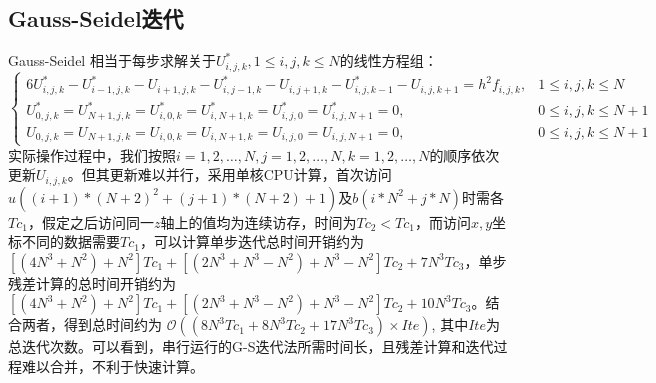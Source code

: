\documentclass{article}
\newcommand{\mO}{\mathcal O}
\begin{document}
\subsection{Gauss-Seidel迭代}
Gauss-Seidel \cite{seidel1873ueber} 相当于每步求解关于$U_{i,j,k}^*,1\le i,j,k\le N$的线性方程组：
\begin{equation}
	\left\{\begin{aligned}
		6 U_{i, j, k}^{*}-U_{i-1, j, k}^{*}-U_{i+1, j, k}-U_{i, j-1, k}^{*}-U_{i, j+1, k}-U_{i, j, k-1}^{*}-U_{i, j, k+1}=h^{2} f_{i, j, k}, & 1 \leq i, j, k \leq N \\
		U_{0, j, k}^{*}=U_{N+1, j, k}^{*}=U_{i, 0, k}^{*}=U_{i, N+1, k}^{*}=U_{i, j, 0}^{*}=U_{i, j, N+1}^{*}=0, & 0 \leq i, j, k \leq N+1 \\
		U_{0, j, k}=U_{N+1, j, k}=U_{i, 0, k}=U_{i, N+1, k}=U_{i, j, 0}=U_{i, j, N+1}=0, & 0 \leq i, j, k \leq N+1
	\end{aligned}\right.
\end{equation}
实际操作过程中，我们按照$i=1,2,\dots,N,j=1,2,\dots,N,k=1,2,\dots,N$的顺序依次更新$U_{i,j,k}$。但其更新难以并行，采用单核CPU计算，首次访问$u((i+1)*(N+2)^2+(j+1)*(N+2)+1)$及$b(i*N^2+j*N)$时需各$Tc_1$，假定之后访问同一$z$轴上的值均为连续访存，时间为$Tc_2<Tc_1$，而访问$x,y$坐标不同的数据需要$Tc_1$，可以计算单步迭代总时间开销约为$[(4N^3 + N^2) + N^2]Tc_1 + [(2N^3+N^3-N^2)+ N^3-N^2]Tc_2 + 7N^3Tc_3 $，单步残差计算的总时间开销约为$[(4N^3 + N^2) + N^2]Tc_1 + [(2N^3+N^3-N^2)+ N^3-N^2]Tc_2 + 10N^3Tc_3 $。结合两者，得到总时间约为 $\mO((8N^3Tc_1+8N^3Tc_2+17N^3Tc_3)\times Ite)$, 其中$Ite$为总迭代次数。可以看到，串行运行的G-S迭代法所需时间长，且残差计算和迭代过程难以合并，不利于快速计算。
\end{document}
